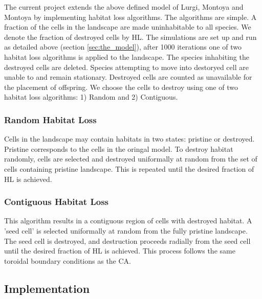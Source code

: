 The current project extends the above defined model of Lurgi, Montoya and Montoya \cite{lurgi2015effects} by implementing habitat loss algorithms. The algorithms are simple. A fraction of the cells in the landscape are made uninhabitable to all species. We denote the fraction of destroyed cells by HL. The simulations are set up and run as detailed above (section \ref{sec:the_model}), after 1000 iterations one of two habitat loss algorithms is applied to the landscape. The species inhabiting the destroyed cells are deleted. Species attempting to move into destoryed cell are unable to and remain stationary. Destroyed cells are counted as unavailable for the placement of offspring. We choose the cells to destroy using one of two habitat loss algorithms: 1) Random and 2) Contiguous.

\subsubsection{Random Habitat Loss}
\label{sec:random_algorithm}  

Cells in the landscape may contain habitats in two states: pristine or destroyed. Pristine corresponds to the cells in the oringal model. To destroy habitat randomly, cells are selected and destroyed uniformally at random from the set of cells containing pristine landscape. This is repeated until the desired fraction of HL is achieved.   

\subsubsection{Contiguous Habitat Loss}
\label{sec:contiguous_algorithm}  

This algorithm results in a contiguous region of cells with destroyed habitat. A 'seed cell' is selected uniformally at random from the fully pristine landscape. The seed cell is destroyed, and destruction proceeds radially from the seed cell until the desired fraction of HL is achieved. This process follows the same toroidal boundary conditions as the CA. 


\subsection{Implementation}
\label{sec:implementation}



